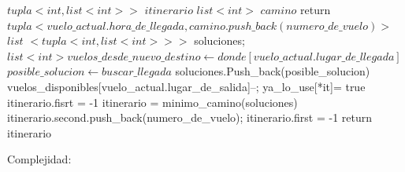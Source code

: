 \documentclass[a4paper]{article}
\begin{document}
\vspace{0.2cm}
\begin{algorithmic}[1]

        \State $tupla<int , list<int> >$ $itinerario$ 
        		\State $list<int>$ $camino$
        		\State return $tupla<vuelo\_actual.hora\_de\_llegada, camino.push\_back(numero\_de\_vuelo) >$
        	\Else 
       			\State $list$ $<tupla<int, list<int> > >$ soluciones;
       			\State $list<int> vuelos\_desde\_nuevo\_destino \gets donde[vuelo\_actual.lugar\_de\_llegada]$ 		 
						\State $posible\_solucion\gets buscar\_llegada$
						\State soluciones.Push\_back(posible\_solucion)
						\State vuelos\_disponibles[vuelo\_actual.lugar\_de\_salida]--;
						\State ya\_lo\_use[*it]= true
					\EndIf					
				\EndFor
					\State itinerario.fisrt = -1
				\Else
					\State itinerario =  minimo\_camino(soluciones)
					\State itinerario.second.push\_back(numero\_de\_vuelo);
				\EndIf
			\Else
				\State itinerario.first = -1
			\EndIf
			\State return itinerario
		 \EndIf			 	
\EndProcedure
\end{algorithmic}

\newpage
{\noindent \Huge Complejidad:}
\newline \newline
\end{document}
